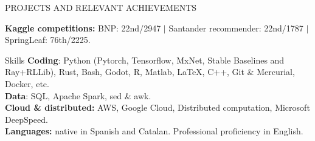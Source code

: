 \documentclass{resume} %
\begin{document}
\begin{rSection}{PROJECTS AND RELEVANT ACHIEVEMENTS}
\vspace{-6pt}

\textbf{Kaggle competitions:} BNP: 22nd/2947 $|$ Santander recommender: 22nd/1787 $|$ SpringLeaf: 76th/2225.


\end{rSection}


\vspace{5pt}

\begin{rSection}{Skills} \itemsep -3pt
{\textbf{Coding}: Python (Pytorch, Tensorflow, MxNet, Stable Baselines and Ray+RLLib), Rust, Bash, Godot, R, Matlab, \LaTeX, C++, Git \& Mercurial, Docker, etc}. \\
{\textbf{Data}: SQL, Apache Spark, sed  \& awk}.\\
{\textbf{Cloud \& distributed:} AWS, Google Cloud, Distributed computation, Microsoft DeepSpeed}. \\
{\textbf{Languages:} native in Spanish and Catalan. Professional proficiency in English.}
\end{rSection}
\end{document}

